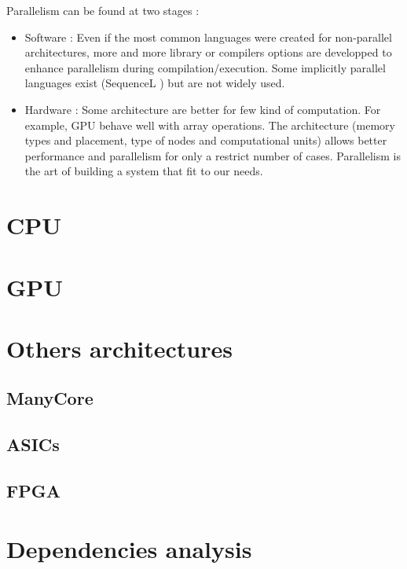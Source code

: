 Parallelism can be found at two stages :
\begin{itemize}
\item Software : Even if the most common languages were created for non-parallel architectures, more and more library or compilers options are developped to enhance parallelism during compilation/execution. Some implicitly parallel languages exist (SequenceL ) but are not widely used.
\item Hardware : Some architecture are better for few kind of computation. For example, GPU behave well with array operations. The architecture (memory types and placement, type of nodes and computational units) allows better performance and parallelism  for only a restrict number of cases. Parallelism is the art of building a system that fit to our needs.
\end{itemize}

\section{CPU}

\section{GPU}

\section{Others architectures}
\subsection{ManyCore}
\subsection{ASICs}
\subsection{FPGA}

\section{Dependencies analysis}